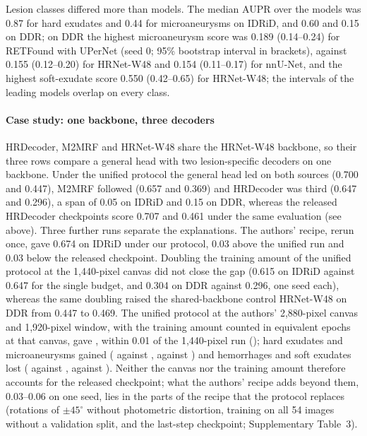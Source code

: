 Lesion classes differed more than models. The median AUPR over the  models was 0.87 for hard exudates and 0.44 for microaneurysms on IDRiD, and 0.60 and 0.15 on DDR; on DDR the highest microaneurysm score was 0.189 (0.14--0.24) for RETFound with UPerNet (seed 0; 95\% bootstrap interval in brackets), against 0.155 (0.12--0.20) for HRNet-W48 and 0.154 (0.11--0.17) for nnU-Net, and the highest soft-exudate score 0.550 (0.42--0.65) for HRNet-W48; the intervals of the leading models overlap on every class.

\paragraph{Case study: one backbone, three decoders}

HRDecoder, M2MRF and HRNet-W48 share the HRNet-W48 backbone, so their three rows compare a general head with two lesion-specific decoders on one backbone. Under the unified protocol the general head led on both sources (0.700 and 0.447), M2MRF followed (0.657 and 0.369) and HRDecoder was third (0.647 and 0.296), a span of 0.05 on IDRiD and 0.15 on DDR, whereas the released HRDecoder checkpoints score 0.707 and 0.461 under the same evaluation (see above). Three further runs separate the explanations. The authors' recipe, rerun once, gave 0.674 on IDRiD under our protocol, 0.03 above the unified run and 0.03 below the released checkpoint. Doubling the training amount of the unified protocol at the 1,440-pixel canvas did not close the gap (0.615 on IDRiD against 0.647 for the single budget, and 0.304 on DDR against 0.296, one seed each), whereas the same doubling raised the shared-backbone control HRNet-W48 on DDR from 0.447 to 0.469. The unified protocol at the authors' 2,880-pixel canvas and 1,920-pixel window, with the training amount counted in equivalent epochs at that canvas, gave , within 0.01 of the 1,440-pixel run (); hard exudates and microaneurysms gained ( against ,  against ) and hemorrhages and soft exudates lost ( against ,  against ). Neither the canvas nor the training amount therefore accounts for the released checkpoint; what the authors' recipe adds beyond them, 0.03--0.06 on one seed, lies in the parts of the recipe that the protocol replaces (rotations of $\pm45^\circ$ without photometric distortion, training on all 54 images without a validation split, and the last-step checkpoint; Supplementary Table~3).

